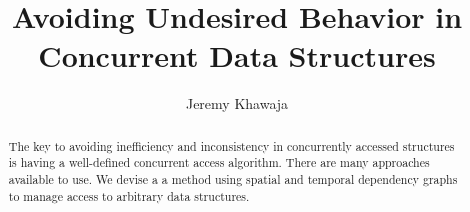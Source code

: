 \documentclass[english]{article}
\begin{document}
	
\hypersetup{
	linktoc=all,     %
	linkcolor=blue,  %
}

\title{Avoiding Undesired Behavior in Concurrent Data Structures}
\author{Jeremy Khawaja}
\maketitle

\begin{abstract}
		The key to avoiding inefficiency and inconsistency in concurrently accessed structures is having a well-defined concurrent access algorithm. There are many approaches available to use. We devise a a method using spatial and temporal dependency graphs to manage access to arbitrary data structures.
\end{abstract}
\twocolumn




%



\end{document}
